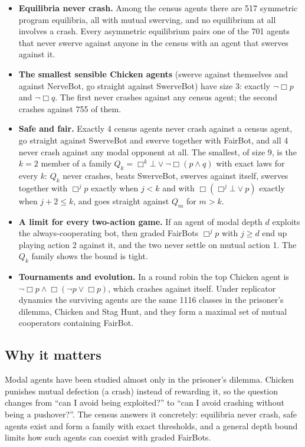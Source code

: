 \documentclass{article}
\begin{document}
\begin{itemize}
\item \textbf{Equilibria never crash.} Among the census agents there are 517 symmetric program equilibria, all with mutual swerving, and no equilibrium at all involves a crash. Every asymmetric equilibrium pairs one of the 701 agents that never swerve against anyone in the census with an agent that swerves against it.
\item \textbf{The smallest sensible Chicken agents} (swerve against themselves and against NerveBot, go straight against SwerveBot) have size 3: exactly $\neg\Box p$ and $\neg\Box q$. The first never crashes against any census agent; the second crashes against 755 of them.
\item \textbf{Safe and fair.} Exactly 4 census agents never crash against a census agent, go straight against SwerveBot and swerve together with FairBot, and all 4 never crash against any modal opponent at all. The smallest, of size 9, is the $k=2$ member of a family $Q_k = \Box^k\bot \vee \neg\Box(p \wedge q)$ with exact laws for every $k$: $Q_k$ never crashes, beats SwerveBot, swerves against itself, swerves together with $\Box^j p$ exactly when $j < k$ and with $\Box(\Box^j\bot \vee p)$ exactly when $j + 2 \le k$, and goes straight against $Q_m$ for $m > k$.
\item \textbf{A limit for every two-action game.} If an agent of modal depth $d$ exploits the always-cooperating bot, then graded FairBots $\Box^j p$ with $j \ge d$ end up playing action 2 against it, and the two never settle on mutual action 1. The $Q_k$ family shows the bound is tight.
\item \textbf{Tournaments and evolution.} In a round robin the top Chicken agent is $\neg\Box p \wedge \Box(\neg p \vee \Box p)$, which crashes against itself. Under replicator dynamics the surviving agents are the same 1116 classes in the prisoner's dilemma, Chicken and Stag Hunt, and they form a maximal set of mutual cooperators containing FairBot.
\end{itemize}

\subsection*{Why it matters}

Modal agents have been studied almost only in the prisoner's dilemma. Chicken punishes mutual
defection (a crash) instead of rewarding it, so the question changes from ``can I avoid being
exploited?'' to ``can I avoid crashing without being a pushover?''. The census answers it
concretely: equilibria never crash, safe agents exist and form a family with exact thresholds, and
a general depth bound limits how such agents can coexist with graded FairBots.
\end{document}
